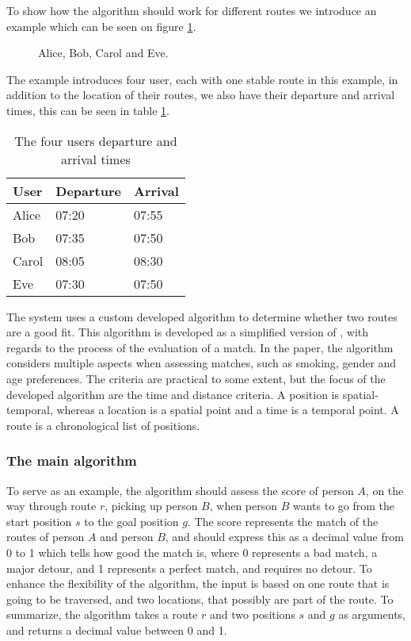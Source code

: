 To show how the algorithm should work for different routes we introduce an example which can be seen on figure \ref{fig:algEx1}.
\begin{figure}
    \centering

    \caption{Alice, Bob, Carol and Eve.}
    \label{fig:algEx1}
\end{figure}
The example introduces four user, each with one stable route in this example, in addition to the location of their routes, we also have their departure and arrival times, this can be seen in table \ref{timetable}.
\begin{table}[]
\centering
\begin{tabular}{@{}lll@{}}
\toprule
\textbf{User} & \textbf{Departure} & \textbf{Arrival} \\ \midrule
Alice         & 07:20                   & 07:55                 \\
Bob           & 07:35                   & 07:50                 \\
Carol         & 08:05                   & 08:30                 \\
Eve           & 07:30                   & 07:50                 \\ \bottomrule
\end{tabular}
\caption{The four users departure and arrival times}
\label{timetable}
\end{table}



The system uses a custom developed algorithm to determine whether two routes are a good fit.
This algorithm is developed as a simplified version of \citet{ghoseiri2011real}, with regards to the process of the evaluation of a match.
In the paper, the algorithm considers multiple aspects when assessing matches, such as smoking, gender and age preferences.
The criteria are practical to some extent, but the focus of the developed algorithm are the time and distance criteria.
A position is spatial-temporal, whereas a location is a spatial point and a time is a temporal point.
A route is a chronological list of positions.

\subsubsection{The main algorithm}
To serve as an example, the algorithm should assess the score of person $A$, on the way through route $r$, picking up person $B$, when person $B$ wants to go from the start position $s$ to the goal position $g$. 
The score represents the match of the routes of person $A$ and person $B$, and should express this as a decimal value from 0 to 1 which tells how good the match is, where 0 represents a bad match, a major detour, and 1 represents a perfect match, and requires no detour.
To enhance the flexibility of the algorithm, the input is based on one route that is going to be traversed, and two locations, that possibly are part of the route.
To summarize, the algorithm takes a route $r$ and two positions $s$ and $g$ as arguments, and returns a decimal value between 0 and 1.


